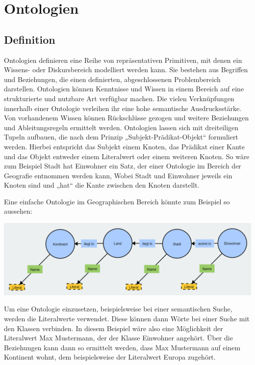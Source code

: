 \chapter{Ontologien}
\section{Definition}
Ontologien definieren eine Reihe von repräsentativen Primitiven, mit denen ein Wissens- oder Diskursbereich modelliert werden kann. Sie bestehen aus Begriffen und Beziehungen, die einen definierten, abgeschlossenen Problembereich darstellen. \cite{TomGruber.2009}\newline
Ontologien können Kenntnisse und Wissen in einem Bereich auf eine strukturierte und nutzbare Art verfügbar machen. Die vielen Verknüpfungen innerhalb einer Ontologie verleihen ihr eine hohe semantische Ausdrucksstärke. Von vorhandenem Wissen können Rückschlüsse gezogen und weitere Beziehungen und Ableitungsregeln ermittelt werden. \cite{WolfgangHesse.2005}\newline
Ontologien lassen sich mit dreiteiligen Tupeln aufbauen, die nach dem Prinzip „Subjekt-Prädikat-Objekt“ formuliert werden. Hierbei entspricht das Subjekt einem Knoten, das Prädikat einer Kante und das Objekt entweder einem Literalwert oder einem weiteren Knoten. So wäre zum Beispiel \glqq[Eine] Stadt hat Einwohner\grqq{} ein Satz, der einer Ontologie im Bereich der Geografie entnommen werden kann, Wobei \glqq Stadt\grqq{} und \glqq Einwohner\grqq{} jeweils ein Knoten sind und „hat“ die Kante zwischen den Knoten darstellt. \cite{Wikipedia.31.10.201911:12}\newline

Eine einfache Ontologie im Geographischen Bereich könnte zum Beispiel so aussehen:\\

\begin{center}
    \includegraphics[width=1\textwidth]{Thesis/Images/SampleOntologyLiterals.png}
\end{center}

Um eine Ontologie einzusetzen, beispielsweise bei einer semantischen Suche, werden die Literalwerte verwendet. Diese können dann Wörte bei einer Suche mit den Klassen verbinden. In diesem Beispiel wäre also eine Möglichkeit der Literalwert \glqq Max Mustermann\grqq{}, der der Klasse \glqq Einwohner\grqq{} angehört. Über die Beziehungen kann dann so ermittelt werden, dass \glqq Max Mustermann\grqq{} auf einem Kontinent wohnt, dem beispielsweise der Literalwert \glqq Europa\grqq{} zugehört.
